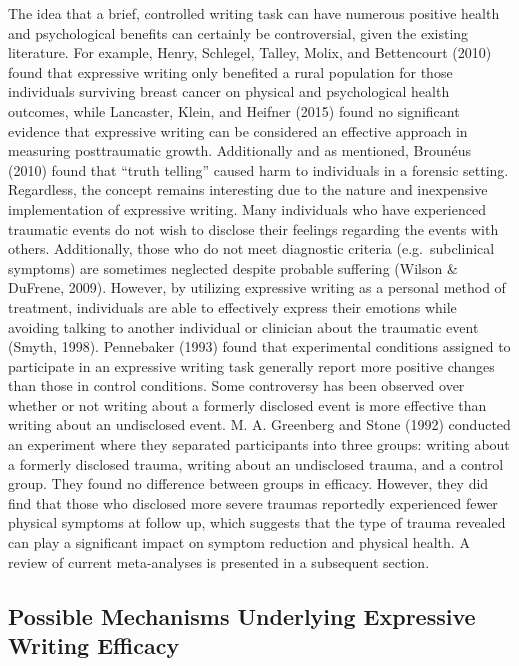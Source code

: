 \documentclass[english,man, mask]{apa6}
\theoremstyle{definition}
\theoremstyle{definition}
\theoremstyle{definition}
\theoremstyle{remark}
\begin{document}
The idea that a brief, controlled writing task can have numerous
positive health and psychological benefits can certainly be
controversial, given the existing literature. For example, Henry,
Schlegel, Talley, Molix, and Bettencourt (2010) found that expressive
writing only benefited a rural population for those individuals
surviving breast cancer on physical and psychological health outcomes,
while Lancaster, Klein, and Heifner (2015) found no significant evidence
that expressive writing can be considered an effective approach in
measuring posttraumatic growth. Additionally and as mentioned, Brounéus
(2010) found that \enquote{truth telling} caused harm to individuals in
a forensic setting. Regardless, the concept remains interesting due to
the nature and inexpensive implementation of expressive writing. Many
individuals who have experienced traumatic events do not wish to
disclose their feelings regarding the events with others. Additionally,
those who do not meet diagnostic criteria (e.g.~subclinical symptoms)
are sometimes neglected despite probable suffering (Wilson \& DuFrene,
2009). However, by utilizing expressive writing as a personal method of
treatment, individuals are able to effectively express their emotions
while avoiding talking to another individual or clinician about the
traumatic event (Smyth, 1998). Pennebaker (1993) found that experimental
conditions assigned to participate in an expressive writing task
generally report more positive changes than those in control conditions.
Some controversy has been observed over whether or not writing about a
formerly disclosed event is more effective than writing about an
undisclosed event. M. A. Greenberg and Stone (1992) conducted an
experiment where they separated participants into three groups: writing
about a formerly disclosed trauma, writing about an undisclosed trauma,
and a control group. They found no difference between groups in
efficacy. However, they did find that those who disclosed more severe
traumas reportedly experienced fewer physical symptoms at follow up,
which suggests that the type of trauma revealed can play a significant
impact on symptom reduction and physical health. A review of current
meta-analyses is presented in a subsequent section.

\subsection{Possible Mechanisms Underlying Expressive Writing
Efficacy}\label{possible-mechanisms-underlying-expressive-writing-efficacy}
\end{document}
